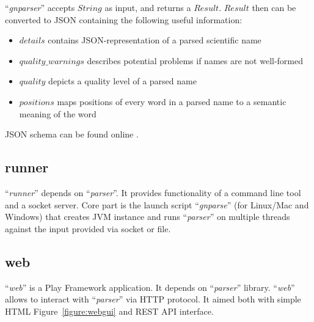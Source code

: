 \documentclass{bmcart}
\begin{document}
``\textit{gnparser}'' accepts $String$ as input, and returns a $Result$.
$Result$ then can be converted to JSON containing the following useful
information:

\begin{itemize}
  \item $details$ contains JSON-representation of a parsed scientific name
  \item $quality\_warnings$ describes potential problems if names are not
    well-formed
  \item $quality$ depicts a quality level of a parsed name
  \item $positions$ maps positions of every word in a parsed name to
    a semantic meaning of the word
\end{itemize}

JSON schema can be found online \cite{gnparser-json}.

\subsection*{runner}

``\textit{runner}'' depends on ``\textit{parser}''. It provides functionality
of a command line tool and a socket server. Core part is the launch script
``\textit{gnparse}'' (for Linux/Mac and Windows) that creates JVM
instance and runs ``\textit{parser}'' on multiple threads against the input
provided via socket or file.

\subsection*{web}

``\textit{web}'' is a Play Framework \cite{wampler2011scala} application. It
depends on ``\textit{parser}'' library. ``\textit{web}'' allows to interact
with ``\textit{parser}'' via HTTP protocol. It aimed both with simple HTML
Figure~\ref{figure:webgui} and REST API interface.
\end{document}
